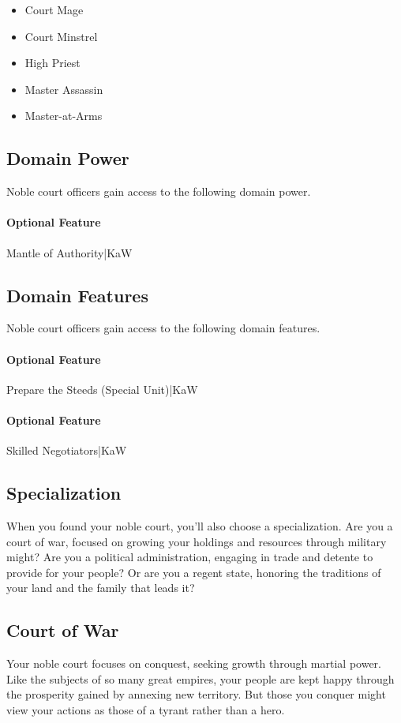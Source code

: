 \documentclass[10pt,a4paper,twoside,bg=print,twocolumn,openany,nodeprecatedcode]{dndbook}
\begin{document}
\begin{itemize}
\item Court Mage
\item Court Minstrel
\item High Priest
\item Master Assassin
\item Master-at-Arms
\end{itemize}

\subsection{Domain Power}
Noble court officers gain access to the following domain power.

\paragraph{Optional Feature}
Mantle of Authority|KaW

\subsection{Domain Features}
Noble court officers gain access to the following domain features.

\paragraph{Optional Feature}
Prepare the Steeds (Special Unit)|KaW

\paragraph{Optional Feature}
Skilled Negotiators|KaW

\subsection{Specialization}
When you found your noble court, you'll also choose a specialization. Are you a court of war, focused on growing your holdings and resources through military might? Are you a political administration, engaging in trade and detente to provide for your people? Or are you a regent state, honoring the traditions of your land and the family that leads it?

\subsection{Court of War}
Your noble court focuses on conquest, seeking growth through martial power. Like the subjects of so many great empires, your people are kept happy through the prosperity gained by annexing new territory. But those you conquer might view your actions as those of a tyrant rather than a hero.
\end{document}
